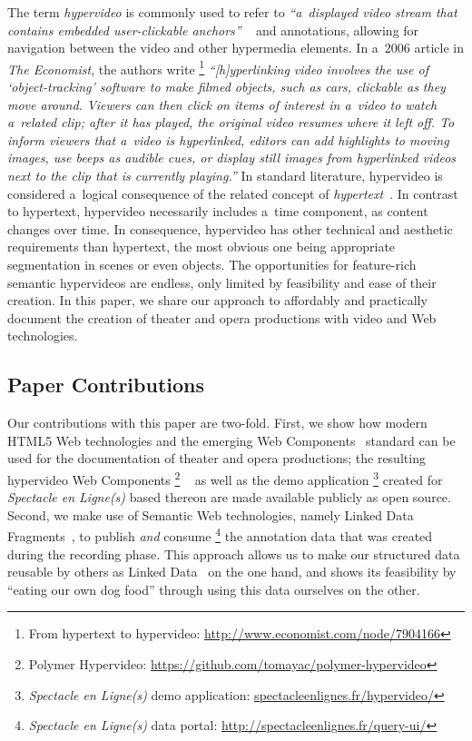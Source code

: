 \documentclass[runningheads,a4paper]{llncs}
\begin{document}
The term \emph{hypervideo} is commonly used to refer to
\textit{``a~displayed video stream that contains embedded user-clickable anchors''}%
~\cite{sawhney1996hypercafe,smith2002extensible}
and annotations, allowing for navigation between the video and other hypermedia elements.
In a~2006 article in \emph{The Economist}, the authors write%
\footnote{From hypertext to hypervideo: \url{http://www.economist.com/node/7904166}} 
\textit{``[h]yperlinking video involves the use of `object-tracking' software
to make filmed objects, such as cars, clickable as they move around.
Viewers can then click on items of interest in a~video
to watch a~related clip; after it has played,
the original video resumes where it left off.
To inform viewers that a~video is hyperlinked,
editors can add highlights to moving images, use beeps as audible cues,
or display still images from hyperlinked videos
next to the clip that is currently playing.''}
In standard literature, hypervideo is considered a~logical consequence
of the related concept of \emph{hypertext}~\cite{bernerslee1990hypertext}.
In contrast to hypertext, hypervideo necessarily includes a~time component,
as content changes over time.
In consequence, hypervideo has other technical and aesthetic requirements
than hypertext, the most obvious one being appropriate segmentation in scenes
or even objects.
The opportunities for feature-rich semantic hypervideos are endless,
only limited by feasibility and ease of their creation.
In this paper, we share our approach to affordably and practically document
the creation of theater and opera productions with video and Web technologies.

\subsection{Paper Contributions}

Our contributions with this paper are two-fold.
First, we show how modern HTML5 Web technologies
and the emerging Web Components~\cite{cooney2013webcomponents} standard
can be used for the documentation of theater and opera productions;
the resulting hypervideo Web Components%
\footnote{Polymer Hypervideo: \url{https://github.com/tomayac/polymer-hypervideo}}%
~\cite{steiner2014hypervideo} as well as the demo application%
\footnote{\emph{Spectacle en Ligne(s)} demo application: \url{spectacleenlignes.fr/hypervideo/}}
created for \emph{Spectacle en Ligne(s)} based thereon
are made available publicly as open source.
Second, we make use of Semantic Web technologies, namely Linked Data Fragments~\cite{verborgh2014ldf},
to publish \emph{and} consume%
\footnote{\emph{Spectacle en Ligne(s)} data portal: \url{http://spectacleenlignes.fr/query-ui/}}
the annotation data that was created during the recording phase.
This approach allows us to make our structured data reusable
by others as Linked Data~\cite{bernerslee2006linkeddata} on the one hand,
and shows its feasibility by ``eating our own dog food'' through using this data ourselves on the other.
\end{document}
